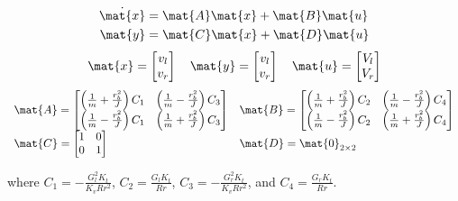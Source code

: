 \begin{theorem}
  \label{thm:diff_drive_velocity_state-space_model}
  \begin{align*}
    \dot{\mat{x}} &= \mat{A} \mat{x} + \mat{B} \mat{u} \\
    \mat{y} &= \mat{C} \mat{x} + \mat{D} \mat{u}
  \end{align*}
  \begin{equation*}
    \mat{x} =
    \begin{bmatrix}
      v_l \\
      v_r
    \end{bmatrix}
    \quad
    \mat{y} =
    \begin{bmatrix}
      v_l \\
      v_r
    \end{bmatrix}
    \quad
    \mat{u} =
    \begin{bmatrix}
      V_l \\
      V_r
    \end{bmatrix}
  \end{equation*}
  \begin{equation}
    \begin{array}{ll}
      \mat{A} =
      \begin{bmatrix}
        \left(\frac{1}{m} + \frac{r_b^2}{J}\right) C_1 & \left(\frac{1}{m} - \frac{r_b^2}{J}\right) C_3 \\
        \left(\frac{1}{m} - \frac{r_b^2}{J}\right) C_1 & \left(\frac{1}{m} + \frac{r_b^2}{J}\right) C_3
      \end{bmatrix} &
      \mat{B} =
      \begin{bmatrix}
        \left(\frac{1}{m} + \frac{r_b^2}{J}\right) C_2 & \left(\frac{1}{m} - \frac{r_b^2}{J}\right) C_4 \\
        \left(\frac{1}{m} - \frac{r_b^2}{J}\right) C_2 & \left(\frac{1}{m} + \frac{r_b^2}{J}\right) C_4
      \end{bmatrix} \\
      \mat{C} =
      \begin{bmatrix}
        1 & 0 \\
        0 & 1 \\
      \end{bmatrix} &
      \mat{D} = \mat{0}_{2 \times 2}
    \end{array}
  \end{equation}

  where $C_1 = -\frac{G_l^2 K_t}{K_v R r^2}$, $C_2 = \frac{G_l K_t}{Rr}$,
  $C_3 = -\frac{G_r^2 K_t}{K_v R r^2}$, and $C_4 = \frac{G_r K_t}{Rr}$.
\end{theorem}

